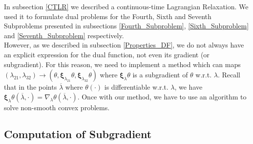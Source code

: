 In subsection \ref{CTLR} we described a continuous-time Lagrangian Relaxation. We used it to formulate dual problems for the Fourth, Sixth and Seventh Subproblems presented in subsections \ref{Fourth_Subproblem}, \ref{Sixth_Subproblem} and \ref{Seventh_Subproblem} respectively.\\
However, as we described in subsection \ref{Properties_DF}, we do not always have an explicit expression for the dual function, not even its gradient (or subgradient). For this reason, we need to implement a method which can maps $(\lambda_{21},\lambda_{32})\to(\theta,\bm{\xi}_{\lambda_{21}}\theta,\bm{\xi}_{\lambda_{32}}\theta)$ where $\bm{\xi}_{\lambda}\theta$ is a subgradient of $\theta$ w.r.t. $\lambda$. Recall that in the points $\overline{\lambda}$ where $\theta(\cdot)$ is differentiable w.r.t. $\lambda$, we have $\bm{\xi}_{\lambda}\theta(\overline{\lambda},\cdot)=\nabla_{\lambda}\theta(\overline{\lambda},\cdot)$. Once with our method, we have to use an algorithm to solve non-smooth convex problems.

\subsection{Computation of Subgradient} \label{Subsection_Oracle}

